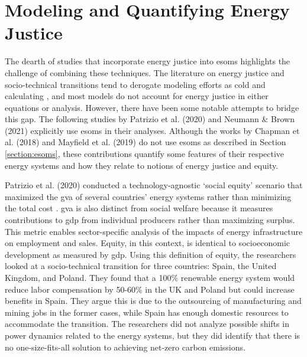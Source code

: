\section{Modeling and Quantifying Energy Justice}

The dearth of studies that incorporate energy justice into \acp{esom} highlights
the challenge of combining these techniques. The literature on energy justice
and socio-technical transitions tend to derogate modeling efforts as cold and
calculating \cite{sovacool_energy_2015,sovacool_energy_2016}, and most models do
not account for energy justice in either equations or analysis. However, there
have been some notable attempts to bridge this gap. The following studies by
Patrizio et al. (2020) \cite{patrizio_socially_2020} and Neumann \& Brown (2021)
\cite{neumann_near-optimal_2021} explicitly use \acp{esom} in their analyses.
Although the works by Chapman et al. (2018) \cite{chapman_prioritizing_2018} and
Mayfield et al. (2019) \cite{mayfield_quantifying_2019} do not use \acp{esom} as
described in Section \ref{section:esoms}, these contributions quantify some
features of their respective energy systems and how they relate to notions of
energy justice and equity.

Patrizio et al. (2020) conducted a technology-agnostic `social equity' scenario
that maximized the \ac{gva} of several countries' energy systems rather than
minimizing the total cost \cite{patrizio_socially_2020}. \Ac{gva} is also
distinct from social welfare because it measures contributions to \ac{gdp} from
individual producers rather than maximizing surplus. This metric enables
sector-specific analysis of the impacts of energy infrastructure on employment
and sales. Equity, in this context, is identical to socioeconomic development as
measured by \ac{gdp}. Using this definition of equity, the researchers looked at
a socio-technical transition for three countries: Spain, the United Kingdom, and
Poland. They found that a 100\% renewable energy system would reduce labor
compensation by 50-60\% in the UK and Poland but could increase benefits in
Spain. They argue this is due to the outsourcing of manufacturing and mining
jobs in the former cases, while Spain has enough domestic resources to
accommodate the transition. The researchers did not analyze possible shifts in
power dynamics related to the energy systems, but they did identify that there
is no one-size-fits-all solution to achieving net-zero carbon emissions.


